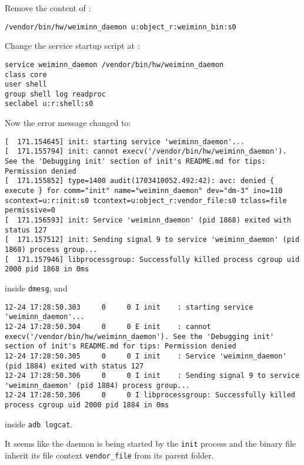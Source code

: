 Remove the content of :
\begin{lstlisting}
/vendor/bin/hw/weiminn_daemon u:object_r:weiminn_bin:s0
\end{lstlisting}

Change the service startup script at :
\begin{lstlisting}
service weiminn_daemon /vendor/bin/hw/weiminn_daemon
class core
user shell
group shell log readproc
seclabel u:r:shell:s0
\end{lstlisting}

Now the error message changed to:
\begin{lstlisting}
[  171.154645] init: starting service 'weiminn_daemon'...
[  171.155794] init: cannot execv('/vendor/bin/hw/weiminn_daemon'). See the 'Debugging init' section of init's README.md for tips: Permission denied
[  171.155852] type=1400 audit(1703410052.492:42): avc: denied { execute } for comm="init" name="weiminn_daemon" dev="dm-3" ino=110 scontext=u:r:init:s0 tcontext=u:object_r:vendor_file:s0 tclass=file permissive=0
[  171.156593] init: Service 'weiminn_daemon' (pid 1868) exited with status 127
[  171.157512] init: Sending signal 9 to service 'weiminn_daemon' (pid 1868) process group...
[  171.157946] libprocessgroup: Successfully killed process cgroup uid 2000 pid 1868 in 0ms    
\end{lstlisting}
inside \texttt{dmesg}, and
\begin{lstlisting}
12-24 17:28:50.303     0     0 I init    : starting service 'weiminn_daemon'...
12-24 17:28:50.304     0     0 E init    : cannot execv('/vendor/bin/hw/weiminn_daemon'). See the 'Debugging init' section of init's README.md for tips: Permission denied
12-24 17:28:50.305     0     0 I init    : Service 'weiminn_daemon' (pid 1884) exited with status 127
12-24 17:28:50.306     0     0 I init    : Sending signal 9 to service 'weiminn_daemon' (pid 1884) process group...
12-24 17:28:50.306     0     0 I libprocessgroup: Successfully killed process cgroup uid 2000 pid 1884 in 0ms
\end{lstlisting}
inside \texttt{adb logcat}.

It seems like the daemon is being started by the \texttt{init} process and the binary file inherit its file context \texttt{vendor\_file} from its parent folder.


